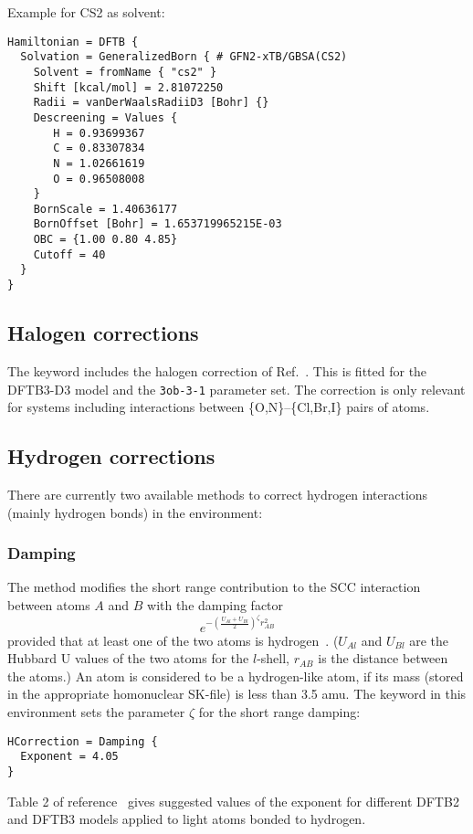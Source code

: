 Example for CS2 as solvent:

\begin{verbatim}
Hamiltonian = DFTB {
  Solvation = GeneralizedBorn { # GFN2-xTB/GBSA(CS2)
    Solvent = fromName { "cs2" }
    Shift [kcal/mol] = 2.81072250
    Radii = vanDerWaalsRadiiD3 [Bohr] {}
    Descreening = Values {
       H = 0.93699367
       C = 0.83307834
       N = 1.02661619
       O = 0.96508008
    }
    BornScale = 1.40636177
    BornOffset [Bohr] = 1.653719965215E-03
    OBC = {1.00 0.80 4.85}
    Cutoff = 40
  }
}
\end{verbatim}

\subsection{Halogen corrections}
\label{sec:dftbp.xcorr}

The  keyword includes the halogen correction of
Ref.~\cite{kubillus-jctc-11-332}. This is fitted for the DFTB3-D3 model and the
{\tt 3ob-3-1} parameter set. The correction is only relevant for systems
including interactions between \{O,N\}--\{Cl,Br,I\} pairs of atoms.


\subsection{Hydrogen corrections}
\label{sec:dftbp.hcorr}

There are currently two available methods to correct hydrogen interactions
(mainly hydrogen bonds) in the  environment:

\subsubsection{Damping}

The  method modifies the short range contribution to the SCC
interaction between atoms $A$ and $B$ with the damping factor
\begin{equation*}
  e^{-\left(\frac{U_{Al} + U_{Bl}}{2}\right)^\zeta r_{AB}^2}
\end{equation*}
provided that at least one of the two atoms is
hydrogen~\cite{gauss-jctc-7-931,yang-JPCA-111-10861}. ($U_{Al}$ and $U_{Bl}$ are
the Hubbard U values of the two atoms for the $l$-shell, $r_{AB}$ is the
distance between the atoms.) An atom is considered to be a hydrogen-like atom,
if its mass (stored in the appropriate homonuclear SK-file) is less than 3.5
amu.  The  keyword in this environment sets the parameter $\zeta$
for the short range damping:
\begin{verbatim}
HCorrection = Damping {
  Exponent = 4.05
}
\end{verbatim}
Table 2 of reference~\cite{gauss-jctc-7-931} gives suggested values of the
exponent for different DFTB2 and DFTB3 models applied to light atoms bonded to
hydrogen.

